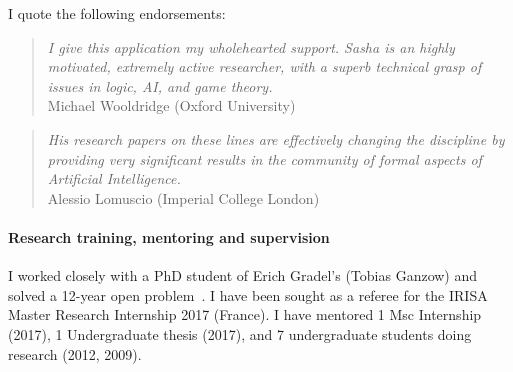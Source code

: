 \documentclass[a4paper,12pt]{scrartcl}
\renewcommand{\todo}[1]{}
\begin{document}
I quote the following endorsements:
\begin{quotation}
\emph{I give this application my wholehearted support. Sasha is an highly motivated, extremely active researcher, with a superb technical grasp of issues in logic, AI, and game theory.} \\  Michael Wooldridge (Oxford University)
\end{quotation}
\begin{quotation}
\emph{His research papers on
these lines are effectively changing the discipline by providing very significant results in the
community of formal aspects of Artificial Intelligence. } \\ Alessio Lomuscio (Imperial College London)
\end{quotation}



% 


\paragraph{Research training, mentoring and supervision}


I worked closely with a PhD student of Erich Gradel's (Tobias Ganzow) and solved a 12-year open problem~\cite{DBLP:conf/stacs/GanzowR08}.
I have been sought as a referee for the IRISA Master Research Internship 2017 (France).
I have mentored 1 Msc Internship (2017), 1 Undergraduate thesis (2017), and 7 undergraduate 
students doing research (2012, 2009).
\end{document}
